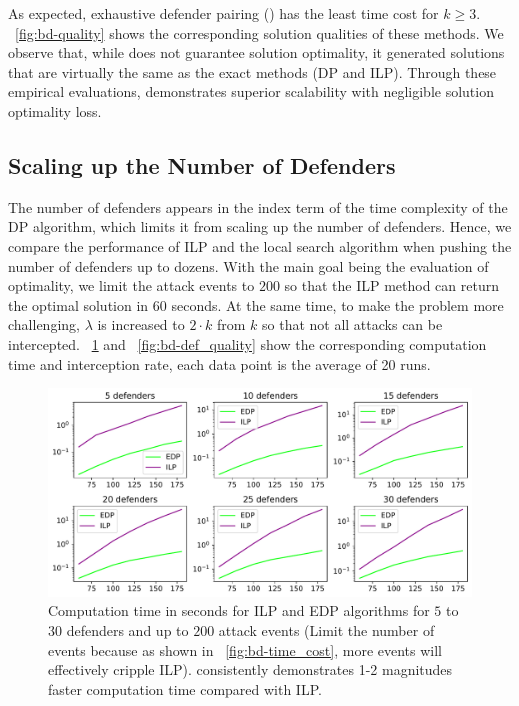 As expected, exhaustive defender pairing (\ours) has the least time cost for $k \geq 3$.
~\ref{fig:bd-quality} shows the corresponding solution qualities of these methods. 
We observe that, while \ours does not guarantee solution optimality, it generated solutions that are virtually the same as the exact methods (DP and ILP). 
%
Through these empirical evaluations, \ours demonstrates superior scalability with negligible solution optimality loss. 



\subsection{Scaling up the Number of Defenders}
The number of defenders appears in the index term of the time complexity of the DP algorithm, which limits it from scaling up the number of defenders. Hence, we compare the performance of ILP and the local search algorithm when pushing the number of defenders up to dozens. With the main goal being the evaluation of optimality, we limit the attack events to $200$ so that the ILP method can return the optimal solution in $60$ seconds. At the same time, to make the problem more challenging, 
$\lambda$ is increased to $2\cdot k$ from $k$ so that not all attacks can be intercepted. 
~\ref{fig:bd-def_time_cost} and  ~\ref{fig:bd-def_quality} show the corresponding computation time 
and interception rate, each data point is the average of 20 runs.

\begin{figure}[h!]
    \centering
    \includegraphics[width=.7\linewidth]{chapters/bd/fig/def_timecost.pdf}
    \caption[Computation time in seconds for ILP and EDP algorithms]{Computation time in seconds for ILP and EDP algorithms for $5$ to $30$ defenders and up to $200$ 
    attack events (Limit the number of events because as shown in ~\ref{fig:bd-time_cost}, 
    more events will effectively cripple ILP). \ours consistently demonstrates 1-2 magnitudes faster computation time compared with ILP.}
    \label{fig:bd-def_time_cost}
\end{figure}

